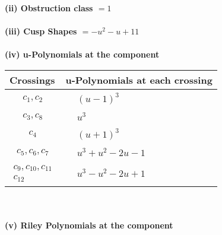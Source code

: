 \documentclass[1p]{elsarticle_modified}
\theoremstyle{definition}
\begin{document}
\flushleft \textbf{(ii) Obstruction class $= 1$}\\~\\
\flushleft \textbf{(iii) Cusp Shapes $= - u^2- u+11$}\\~\\
\newpage\renewcommand{\arraystretch}{1}
\flushleft \textbf{(iv) u-Polynomials at the component}\newline \\
\begin{tabular}{m{50pt}|m{274pt}}
Crossings & \hspace{64pt}u-Polynomials at each crossing \\
\hline $$\begin{aligned}c_{1},c_{2}\end{aligned}$$&$\begin{aligned}
&(u-1)^3
\end{aligned}$\\
\hline $$\begin{aligned}c_{3},c_{8}\end{aligned}$$&$\begin{aligned}
&u^3
\end{aligned}$\\
\hline $$\begin{aligned}c_{4}\end{aligned}$$&$\begin{aligned}
&(u+1)^3
\end{aligned}$\\
\hline $$\begin{aligned}c_{5},c_{6},c_{7}\end{aligned}$$&$\begin{aligned}
&u^3+u^2-2 u-1
\end{aligned}$\\
\hline $$\begin{aligned}c_{9},c_{10},c_{11}\\c_{12}\end{aligned}$$&$\begin{aligned}
&u^3- u^2-2 u+1
\end{aligned}$\\
\hline
\end{tabular}\\~\\
\newpage\renewcommand{\arraystretch}{1}
\flushleft \textbf{(v) Riley Polynomials at the component}\newline \\
\end{document}
